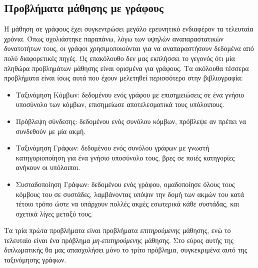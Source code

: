 \subsection{Προβλήματα μάθησης με γράφους}
Η μάθηση σε γράφους έχει συγκεντρώσει μεγάλο ερευνητικό ενδιαφέρον τα τελευταία χρόνια.
Όπως σχολιάστηκε παραπάνω, λόγω των υψηλών αναπαραστατικών δυνατοτήτων τους, οι γράφοι χρησιμοποιούνται για να αναπαραστήσουν δεδομένα από πολύ διαφορετικές πηγές.
Ως επακόλουθο δεν μας εκπλήσσει το γεγονός ότι μία πληθώρα προβλημάτων μάθησης είναι ορισμένα για γράφους.
Τα ακόλουθα τέσσερα προβλήματα είναι ίσως αυτά που έχουν μελετηθεί περισσότερο στην βιβλιογραφία:
\begin{itemize}
\item Ταξινόμηση Κόμβων: δεδομένου ενός γράφου με επισημειώσεις σε ένα γνήσιο υποσύνολο των κόμβων, επισημείωσε αποτελεσματικά τους υπόλοιπους.
\item Πρόβλεψη σύνδεσης: δεδομένου ενός συνόλου κόμβων, πρόβλεψε αν πρέπει να συνδεθούν με μία ακμή.
\item Ταξινόμηση Γράφων: δεδομένου ενός συνόλου γράφων με γνωστή κατηγοριοποίηση για ένα γνήσιο υποσύνολο τους, βρες σε ποιές κατηγορίες ανήκουν οι υπόλοιποι.
\item Συσταδοποίηση Γράφων: δεδομένου ενός γράφου, ομαδοποίησε όλους τους κόμβους του σε συστάδες, λαμβάνοντας υπόψιν την δομή των ακμών του κατά τέτοιο τρόπο ώστε να υπάρχουν πολλές ακμές εσωτερικά κάθε συστάδας, και σχετικά λίγες μεταξύ τους.
\end{itemize}
Τα τρία πρώτα προβλήματα είναι προβλήματα \textit{επιτηρούμενης} μάθησης, ενώ το τελευταίο είναι ένα πρόβλημα \textit{μη-επιτηρούμενης} μάθησης.
Στο εύρος αυτής της διπλωματικής θα μας απασχολήσει μόνο το τρίτο πρόβλημα, συγκεκριμένα αυτό της ταξινόμησης γράφων.
